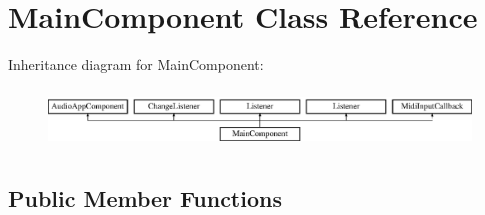 \hypertarget{class_main_component}{}\section{Main\+Component Class Reference}
\label{class_main_component}
Inheritance diagram for Main\+Component\+:\begin{figure}[H]
\begin{center}
\leavevmode
\includegraphics[height=1.611511cm]{class_main_component}
\end{center}
\end{figure}
\subsection*{Public Member Functions}
